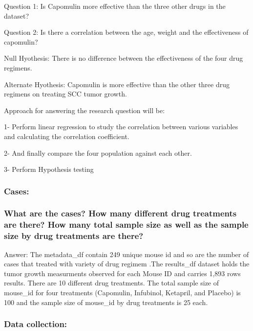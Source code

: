 \documentclass[
]{article}
\begin{document}
Question 1: Is Capomulin more effective than the three other drugs in
the dataset?

Question 2: Is there a correlation between the age, weight and the
effectiveness of capomulin?

Null Hyothesis: There is no difference between the effectiveness of the
four drug regimens.

Alternate Hyothesis: Capomulin is more effective than the other three
drug regimens on treating SCC tumor growth.

Approach for answering the research question will be:

1- Perform linear regression to study the correlation between various
variables and calculating the correlation coefficient.

2- And finally compare the four population against each other.

3- Perform Hypothesis testing

\hypertarget{cases}{%
\subsubsection{Cases:}\label{cases}}

\hypertarget{what-are-the-cases-how-many-different-drug-treatments-are-there-how-many-total-sample-size-as-well-as-the-sample-size-by-drug-treatments-are-there}{%
\subsubsection{What are the cases? How many different drug treatments
are there? How many total sample size as well as the sample size by drug
treatments are
there?}\label{what-are-the-cases-how-many-different-drug-treatments-are-there-how-many-total-sample-size-as-well-as-the-sample-size-by-drug-treatments-are-there}}

Answer: The metadata\_df contain 249 unique mouse id and so are the
number of cases that treated with variety of drug regimem .The
results\_df dataset holds the tumor growth measurments observed for each
Mouse ID and carries 1,893 rows results. There are 10 different drug
treatments. The total sample size of mouse\_id for four treatments
(Capomulin, Infubinol, Ketapril, and Placebo) is 100 and the sample size
of mouse\_id by drug treatments is 25 each.

\hypertarget{data-collection}{%
\subsubsection{Data collection:}\label{data-collection}}
\end{document}
